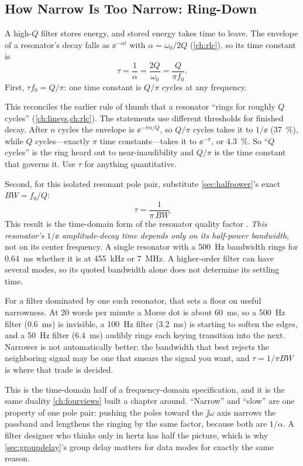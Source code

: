 \subsection{How Narrow Is Too Narrow: Ring-Down}
\label{sec:ringdown}
A high-\(Q\) filter stores energy, and stored energy takes time to leave. The
envelope of a resonator's decay falls as \(\ee^{-\alpha t}\) with
\(\alpha=\omega_0/2Q\) (\cref{ch:rlc}), so its time constant is
\[
\tau=\frac{1}{\alpha}=\frac{2Q}{\omega_0}=\frac{Q}{\pi f_0}.
\]
First, \(\tau f_0=Q/\pi\): one time constant is \(Q/\pi\) cycles at any frequency.

This reconciles the earlier rule of thumb that a resonator ``rings for roughly
\(Q\) cycles'' (\cref{ch:linsys,ch:rlc}). The statements use different thresholds
for finished decay. After \(n\) cycles
the envelope is \(\ee^{-\pi n/Q}\), so \(Q/\pi\) cycles takes it to \(1/\ee\)
(\SI{37}{\percent}), while \(Q\) cycles---exactly \(\pi\) time constants---takes it
to \(\ee^{-\pi}\), or \SI{4.3}{\percent}. So ``\(Q\) cycles'' is the ring heard out
to near-inaudibility and \(Q/\pi\) is the time constant that governs it. Use \(\tau\)
for anything quantitative.

Second, for this isolated resonant pole pair, substitute
\cref{sec:halfpower}'s exact \(BW=f_0/Q\):
\[
\boxed{\;\tau=\frac{1}{\pi\,BW}\;}
\]
This result is the time-domain form of the resonator quality factor
\cite[pp.~187--191]{weber2001microwave}.
\emph{This resonator's \(1/\ee\) amplitude-decay time depends only on its
half-power bandwidth}, not on its center frequency. A single resonator with a
\SI{500}{\hertz} bandwidth rings for \SI{0.64}{\milli\second} whether it is at
\SI{455}{\kilo\hertz} or \SI{7}{\mega\hertz}. A higher-order filter can have several
modes, so its quoted bandwidth alone does not determine its settling time.

For a filter dominated by one such resonator, that sets a floor on useful narrowness.
At \SI{20}{} words per minute a Morse dot is
about \SI{60}{\milli\second}, so a \SI{500}{\hertz} filter (\SI{0.6}{\milli\second})
is invisible, a \SI{100}{\hertz} filter (\SI{3.2}{\milli\second}) is starting to
soften the edges, and a \SI{50}{\hertz} filter (\SI{6.4}{\milli\second}) audibly rings
each keying transition into the next. Narrower is not automatically better: the
bandwidth that best rejects the neighboring signal may be one that smears the signal
you want, and \(\tau=1/\pi BW\) is where that trade is decided.

\begin{controlsbox}
This is the time-domain half of a frequency-domain specification, and it is the same
duality \cref{ch:fourviews} built a chapter around. ``Narrow'' and ``slow'' are one
property of one pole pair: pushing the poles toward the \(\jj\omega\) axis narrows the
passband and lengthens the ringing by the same factor, because both are
\(1/\alpha\). A filter designer who thinks only in hertz has half the picture, which
is why \cref{sec:groupdelay}'s group delay matters for data modes for exactly the
same reason.
\end{controlsbox}

